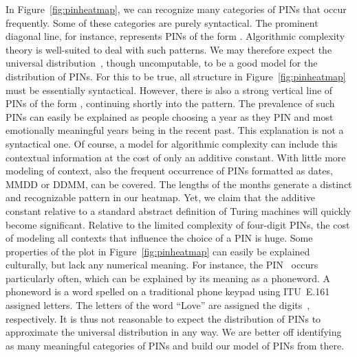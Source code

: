 \begin{example}
  In Figure~\ref{fig:pinheatmap}, we can recognize many categories of PINs that occur frequently.
  Some of these categories are purely syntactical.
  The prominent diagonal line, for instance, represents PINs of the form .
  Algorithmic complexity theory is well-suited to deal with such patterns.
  We may therefore expect the universal distribution~\parencite{li2008introduction}, though uncomputable, to be a good model for the distribution of PINs.
  For this to be true, all structure in Figure~\ref{fig:pinheatmap} must be essentially syntactical.
  However, there is also a strong vertical line of PINs of the form , continuing shortly into the  pattern.
  The prevalence of such PINs can easily be explained as people choosing a year as they PIN and most emotionally meaningful years being in the recent past.
  This explanation is not a syntactical one.
  Of course, a model for algorithmic complexity can include this contextual information at the cost of only an additive constant.
  With little more modeling of context, also the frequent occurrence of PINs formatted as dates, MMDD or DDMM, can be covered.
  The lengths of the months generate a distinct and recognizable pattern in our heatmap.
  Yet, we claim that the additive constant relative to a standard abstract definition of Turing machines will quickly become significant.
  Relative to the limited complexity of four-digit PINs, the cost of modeling all contexts that influence the choice of a PIN is huge.
  Some properties of the plot in Figure~\ref{fig:pinheatmap} can easily be explained culturally, but lack any numerical meaning.
  For instance, the PIN~ occurs particularly often, which can be explained by its meaning as a phoneword.
  A phoneword is a word spelled on a traditional phone keypad using ITU~E.161 assigned letters.
  The letters of the word \enquote{Love} are assigned the digits~, respectively.
  It is thus not reasonable to expect the distribution of PINs to approximate the universal distribution in any way.
  We are better off identifying as many meaningful categories of PINs and build our model of PINs from there.
\end{example}


